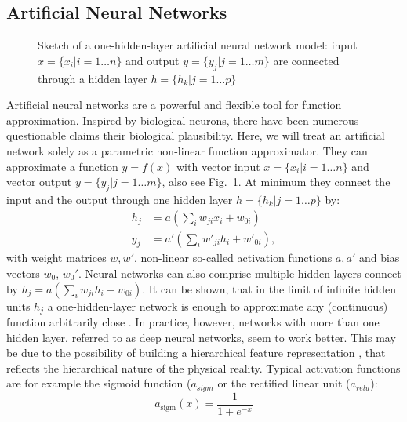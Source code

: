 	\subsection{Artificial Neural Networks}\label{sec:neuralnetworks}

		\begin{figure}[htp]
			\centering
			
			\caption{Sketch of a one-hidden-layer artificial neural network model: input $x = \{ x_i | i = 1 \ldots n \}$ and output $y = \{ y_j | j = 1 \ldots m \}$ are connected through a hidden layer $h = \{h_k | j = 1 \ldots p \}$ }
			\label{fig:neuralnet}
		\end{figure}
		Artificial neural networks are a powerful and flexible tool for function approximation. Inspired by biological neurons, there have been numerous questionable claims \wrt their biological plausibility. %
		Here, we will treat an artificial network solely as a parametric non-linear function approximator. They can approximate a function $y = f(x)$ with vector input $x = \{ x_i | i = 1 \ldots n \}$ and vector output $y = \{ y_j | j = 1 \ldots m \}$, also see Fig.~\ref{fig:neuralnet}. At minimum they connect the input and the output through one hidden layer $h = \{h_k | j = 1 \ldots p \}$ by:
		\begin{equation} \label{eq1}
			\begin{split}
				h_j & =  a (\sum_i w_{ji} x_i + w_{0i})  \\
				y_j & =  a' (\sum_i w'_{ji} h_i + w'_{0i}),
			\end{split}
		\end{equation}
		with weight matrices $w, w'$, non-linear so-called activation functions $a, a'$  and bias vectors $w_{0}$, $w_{0}'$.
		Neural networks can also comprise multiple hidden layers connect by $h_j  =  a (\sum_i w_{ji} h_i + w_{0i})$.
		It can be shown, that in the limit of infinite hidden units $h_j$ a one-hidden-layer network is enough to approximate any (continuous) function arbitrarily close \cite{cybenko89approx, hornik91approx}.
		In practice, however, networks with more than one hidden layer, referred to as deep neural networks, seem to work better. This may be due to the possibility of building a hierarchical feature representation \cite{zeiler14vis}, that reflects the hierarchical nature of the physical reality.
		Typical activation functions are for example the sigmoid function ($a_{sigm}$ or the rectified linear unit ($a_{relu}$):
		\begin{equation}
			a_{\textrm{sigm}}(x)= \frac{1}{1+e^{-x}}
		\end{equation}

